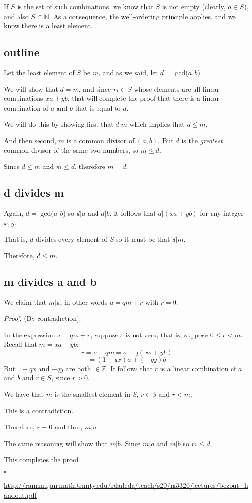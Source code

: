 \documentclass[11pt, oneside]{article}
\begin{document}
If $S$ is the set of such combinations, we know that $S$ is not empty (clearly, $a \in S$), and also $S \subset \mathbb{N}$.  As a consequence, the well-ordering principle applies, and we know there is a least element.

\subsection*{outline}

Let the least element of $S$ be $m$, and as we said, let $d = $ gcd($a,b$).  

We will show that $d = m$, and since $m \in S$ whose elements are all linear combinations $xa + yb$, that will complete the proof that there is a linear combination of $a$ and $b$ that is equal to $d$.

We will do this by showing first that $d|m$ which implies that $d \le m$.  

And then second, $m$ is a common divisor of $(a,b)$.  But $d$ is the \emph{greatest} common divisor of the same two numbers, so $m \le d$.  

Since $d \le m$ and $m \le d$, therefore $m = d$.

\subsection*{d divides m}
Again, $d = $ gcd($a,b$) so $d|a$ and $d|b$.  It follows that $d | (xa + yb)$ for any integer $x,y$.  

That is, $d$ divides every element of $S$ so it must be that $d | m$.

Therefore, $d \le m$.

\subsection*{m divides a and b} 
We claim that $m|a$, in other words $a = qm + r$ with $r = 0$.  

\emph{Proof}.  (By contradiction).  

In the expression $a = qm + r$, suppose $r$ is not zero, that is, suppose $0 \le r < m$.  Recall that $m = xa + yb$:
\[ r = a - qm = a - q(xa + yb) \]
\[ = (1 - qx)a + (-qy)b \]
But $1 - qx$ and $-qy$ are both $\in \mathbb{Z}$.  It follows that $r$ is a linear combination of $a$ and $b$ and $r \in S$, since $r > 0$.

We have that $m$ is the smallest element in $S$, $r \in S$ and $r < m$.  

This is a contradiction.

Therefore, $r = 0$ and thus, $m|a$.

The same reasoning will show that $m|b$.  Since $m|a$ and $m|b$ so $m \le d$.

This completes the proof.

$\square$

\url{http://ramanujan.math.trinity.edu/rdaileda/teach/s20/m3326/lectures/bezout_handout.pdf}
\end{document}
